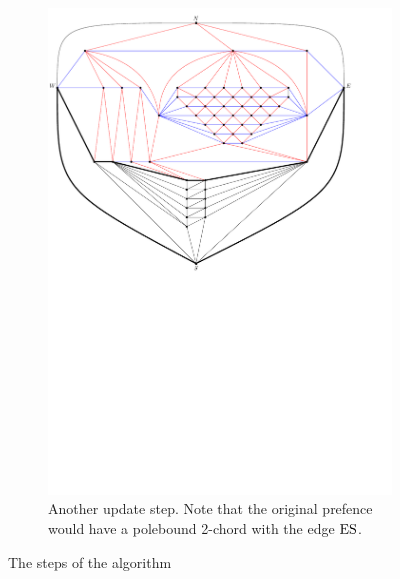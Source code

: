 \begin{figure}
\begin{subfigure}[b]{.9 \textwidth}
      \includegraphics[width=\textwidth]{examples/img/vertWorstCase/sweep6}
      \caption{Another update step. Note that the original prefence would have a polebound 2-chord with the edge $\mathrm{E} \mathrm{S}$.}
      \label{fig:ex:vert:sweep6}
    \end{subfigure}
    \caption{The steps of the algorithm}
\end{figure}

